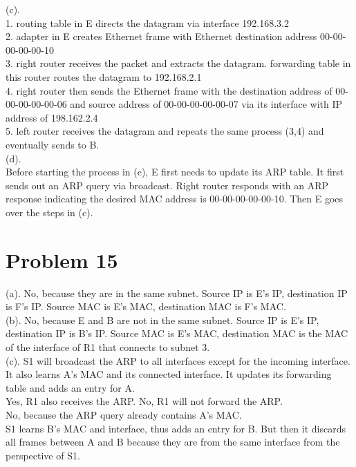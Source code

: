 \documentclass[titlepage, paper=a4, fontsize=11pt]{scrartcl} %
\numberwithin{equation}{section} %
\numberwithin{table}{section} %
\begin{document}
(c). \\
1. routing table in E directs the datagram via interface 192.168.3.2 \\
2. adapter in E creates Ethernet frame with Ethernet destination address 00-00-00-00-00-10 \\
3. right router receives the packet and extracts the datagram. forwarding table in this router routes the datagram to 192.168.2.1 \\
4. right router then sends the Ethernet frame with the destination address of 00-00-00-00-00-06 and source address of 00-00-00-00-00-07 via its interface with IP address of 198.162.2.4 \\
5. left router receives the datagram and repeats the same process (3,4) and eventually sends to B. \\

(d). \\
Before starting the process in (c), E first needs to update its ARP table. It first sends out an ARP query via broadcast. Right router responds with an ARP response indicating the desired MAC address is 00-00-00-00-00-10. Then E goes over the steps in (c).





\section*{Problem 15}
(a). No, because they are in the same subnet. Source IP is E's IP, destination IP is F's IP. Source MAC is E's MAC, destination MAC is F's MAC. \\

(b). No, because E and B are not in the same subnet. Source IP is E's IP, destination IP is B's IP. Source MAC is E's MAC, destination MAC is the MAC of the interface of R1 that connects to subnet 3. \\

(c). S1 will broadcast the ARP to all interfaces except for the incoming interface. It also learns A's MAC and its connected interface. It updates its forwarding table and adds an entry for A. \\
Yes, R1 also receives the ARP. No, R1 will not forward the ARP. \\
No, because the ARP query already contains A's MAC. \\
S1 learns B's MAC and interface, thus adds an entry for B. But then it discards all frames between A and B because they are from the same interface from the perspective of S1.
\\
\end{document}
